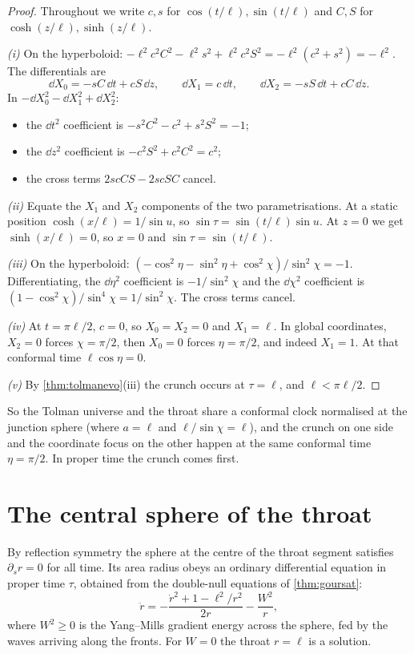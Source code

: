\begin{proof}
Throughout we write $c,s$ for $\cos(t/\ell),\sin(t/\ell)$ and $C,S$ for $\cosh(z/\ell),\sinh(z/\ell)$.

\emph{(i)} On the hyperboloid: $-\ell^2c^2C^2-\ell^2s^2+\ell^2c^2S^2=-\ell^2(c^2+s^2)=-\ell^2$. The differentials are
\[
\dd X_0=-sC\,\dd t+cS\,\dd z,\qquad\dd X_1=c\,\dd t,\qquad\dd X_2=-sS\,\dd t+cC\,\dd z .
\]
In $-\dd X_0^2-\dd X_1^2+\dd X_2^2$:
\begin{itemize}[nosep]
\item the $\dd t^2$ coefficient is $-s^2C^2-c^2+s^2S^2=-1$;
\item the $\dd z^2$ coefficient is $-c^2S^2+c^2C^2=c^2$;
\item the cross terms $2scCS-2scSC$ cancel.
\end{itemize}

\emph{(ii)} Equate the $X_1$ and $X_2$ components of the two parametrisations. At a static position $\cosh(x/\ell)=1/\sin u$, so $\sin\tau=\sin(t/\ell)\sin u$. At $z=0$ we get $\sinh(x/\ell)=0$, so $x=0$ and $\sin\tau=\sin(t/\ell)$.

\emph{(iii)} On the hyperboloid: $(-\cos^2\eta-\sin^2\eta+\cos^2\chi)/\sin^2\chi=-1$. Differentiating, the $\dd\eta^2$ coefficient is $-1/\sin^2\chi$ and the $\dd\chi^2$ coefficient is $(1-\cos^2\chi)/\sin^4\chi=1/\sin^2\chi$. The cross terms cancel.

\emph{(iv)} At $t=\pi\ell/2$, $c=0$, so $X_0=X_2=0$ and $X_1=\ell$. In global coordinates, $X_2=0$ forces $\chi=\pi/2$, then $X_0=0$ forces $\eta=\pi/2$, and indeed $X_1=1$. At that conformal time $\ell\cos\eta=0$.

\emph{(v)} By \cref{thm:tolmanevo}(iii) the crunch occurs at $\tau=\ell$, and $\ell<\pi\ell/2$.
\end{proof}


So the Tolman universe and the throat share a conformal clock normalised at the junction sphere (where $a=\ell$ and $\ell/\sin\chi=\ell$), and the crunch on one side and the coordinate focus on the other happen at the same conformal time $\eta=\pi/2$. In proper time the crunch comes first.

\section{The central sphere of the throat}

By reflection symmetry the sphere at the centre of the throat segment satisfies $\partial_sr=0$ for all time. Its area radius obeys an ordinary differential equation in proper time $\tau$, obtained from the double-null equations of \cref{thm:goursat}:
\begin{equation}\label{eq:centre}
\ddot r=-\frac{\dot r^2+1-\ell^2/r^2}{2r}-\frac{W^2}{r},
\end{equation}
where $W^2\ge0$ is the Yang--Mills gradient energy across the sphere, fed by the waves arriving along the fronts. For $W=0$ the throat $r=\ell$ is a solution.

